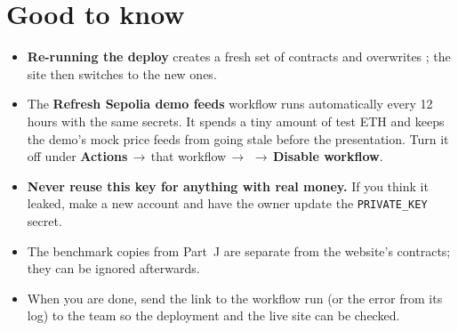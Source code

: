 \documentclass[11pt,a4paper]{article}
\newcommand{\ui}[1]{\textsf{\textbf{#1}}}
\newcommand{\code}[1]{\texttt{#1}}
\newcommand{\arr}{\,$\rightarrow$\,}
\begin{document}
\section{Good to know}
\begin{itemize}
  \item \textbf{Re-running the deploy} creates a fresh set of contracts and overwrites ; the site then switches to the new ones.
  \item The \ui{Refresh Sepolia demo feeds} workflow runs automatically every 12 hours with the same secrets. It spends a tiny amount of test ETH and keeps the demo's mock price feeds from going stale before the presentation. Turn it off under \ui{Actions}\arr that workflow\arr\ui{\faEllipsisH}\arr\ui{Disable workflow}.
  \item \textbf{Never reuse this key for anything with real money.} If you think it leaked, make a new account and have the owner update the \code{PRIVATE\_KEY} secret.
  \item The benchmark copies from Part~J are separate from the website's contracts; they can be ignored afterwards.
  \item When you are done, send the link to the workflow run (or the error from its log) to the team so the deployment and the live site can be checked.
\end{itemize}
\end{document}
